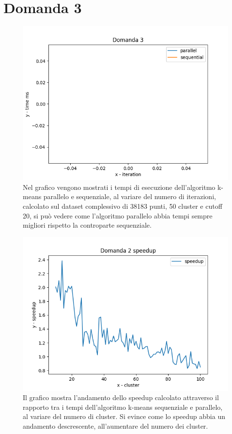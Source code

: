 \documentclass{article}
\begin{document}
\vspace{-3cm}
\section*{Domanda 3}
\begin{center}
	\begin{figure}[H]
		\hspace*{1.5cm}\includegraphics[width=0.7\linewidth, valign=t]{figures/domanda3}
		\caption*{Nel grafico vengono mostrati i tempi di esecuzione dell'algoritmo k-means parallelo e sequenziale, al variare del numero di iterazioni, calcolato sul dataset complessivo di 38183 punti, 50 cluster e cutoff 20, si può vedere come l'algoritmo parallelo abbia tempi sempre migliori rispetto la controparte sequenziale.}
	\end{figure}
\end{center}

\begin{center}
	\begin{figure}[H]
		\hspace*{1.5cm}\includegraphics[width=0.7\linewidth, valign=t]{figures/domanda2speedup}
		\caption*{Il grafico mostra l'andamento dello speedup calcolato attraverso il rapporto tra i tempi dell'algoritmo k-means sequenziale e parallelo, al variare del numero di cluster. Si evince come lo speedup abbia un andamento descrescente, all'aumentare del numero dei cluster.}
	\end{figure}
\end{center}
\end{document}
